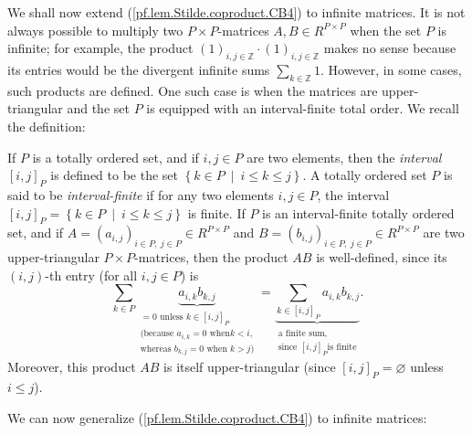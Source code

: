 \documentclass[numbers=enddot,12pt,final,onecolumn,notitlepage]{scrartcl}%
\numberwithin{exer}{section}
\theoremstyle{definition}
\let\sumnonlimits\sum
\renewcommand{\sum}{\sumnonlimits\limits}
\theoremstyle{plainsl}
\begin{document}
We shall now extend (\ref{pf.lem.Stilde.coproduct.CB4}) to infinite matrices.
It is not always possible to multiply two $P\times P$-matrices $A,B\in
R^{P\times P}$ when the set $P$ is infinite; for example, the product $\left(
1\right)  _{i,j\in\mathbb{Z}}\cdot\left(  1\right)  _{i,j\in\mathbb{Z}}$ makes
no sense because its entries would be the divergent infinite sums $\sum
_{k\in\mathbb{Z}}1$. However, in some cases, such products are defined. One
such case is when the matrices are upper-triangular and the set $P$ is
equipped with an interval-finite total order. We recall the definition:

If $P$ is a totally ordered set, and if $i,j\in P$ are two elements, then the
\emph{interval} $\left[  i,j\right]  _{P}$ is defined to be the set $\left\{
k\in P\ \mid\ i\leq k\leq j\right\}  $. A totally ordered set $P$ is said to
be \emph{interval-finite} if for any two elements $i,j\in P$, the interval
$\left[  i,j\right]  _{P}=\left\{  k\in P\ \mid\ i\leq k\leq j\right\}  $ is
finite. If $P$ is an interval-finite totally ordered set, and if $A=\left(
a_{i,j}\right)  _{i\in P,\ j\in P}\in R^{P\times P}$ and $B=\left(
b_{i,j}\right)  _{i\in P,\ j\in P}\in R^{P\times P}$ are two upper-triangular
$P\times P$-matrices, then the product $AB$ is well-defined, since its
$\left(  i,j\right)  $-th entry (for all $i,j\in P$) is
\[
\sum_{k\in P}\underbrace{a_{i,k}b_{k,j}}_{\substack{=0\text{ unless }%
k\in\left[  i,j\right]  _{P}\\\text{(because }a_{i,k}=0\text{ when
}k<i\text{,}\\\text{whereas }b_{k,j}=0\text{ when }k>j\text{)}}%
}=\underbrace{\sum_{k\in\left[  i,j\right]  _{P}}a_{i,k}b_{k,j}}%
_{\substack{\text{a finite sum,}\\\text{since }\left[  i,j\right]  _{P}\text{
is finite}}}.
\]
Moreover, this product $AB$ is itself upper-triangular (since $\left[
i,j\right]  _{P}=\varnothing$ unless $i\leq j$).

We can now generalize (\ref{pf.lem.Stilde.coproduct.CB4}) to infinite matrices:
\end{document}
